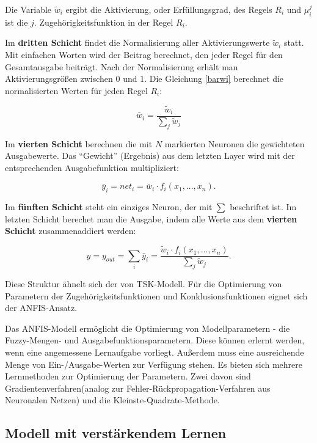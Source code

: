 Die Variable $\tilde{w}_i$ ergibt die Aktivierung, oder Erf\"{u}llungsgrad, des Regels $R_i$ und $\mu_i^j$ ist die $j.$ Zugehörigkeitsfunktion in der Regel $R_i$.

Im \textbf{dritten Schicht} findet die Normalisierung aller Aktivierungswerte $\tilde{w}_i$ statt. Mit einfachen Worten wird der Beitrag berechnet, den jeder Regel für den Gesamtausgabe beiträgt. Nach der Normalisierung erhält man Aktivierungsgrößen zwischen $0$ und $1$. Die Gleichung \ref{barwi} berechnet die normalisierten Werten für jeden Regel $R_i$:

\begin{equation}\label{barwi}
\bar{w}_i = \frac{\tilde{w}_i }{\sum_j \tilde{w}_j } 
\end{equation}

Im \textbf{vierten Schicht} berechnen die mit $N$ markierten Neuronen die gewichteten Ausgabewerte. Das ``Gewicht'' (Ergebnis) aus dem letzten Layer wird mit der entsprechenden Ausgabefunktion multipliziert:

\begin{equation}
\bar{y}_i = net_i = \bar{w}_i\cdot f_i(x_1, ..., x_n). 
\end{equation}

Im \textbf{fünften Schicht} steht ein einziges Neuron, der mit $\sum$ beschriftet ist. Im letzten Schicht berechet man die Ausgabe, indem alle Werte aus dem \textbf{vierten Schicht} zusammenaddiert werden:

\begin{equation}
y = y_{out} = \sum_i \bar{y}_i = \frac{\tilde{w}_i\cdot f_i(x_1, ..., x_n)}{\sum_j \tilde{w}_j}.
\end{equation}

Diese Struktur ähnelt sich der von TSK-Modell. Für die Optimierung von Parametern der Zugehörigkeitsfunktionen und Konklusionsfunktionen eignet sich der ANFIS-Ansatz.

Das ANFIS-Modell ermöglicht die Optimierung von Modellparametern - die Fuzzy-Mengen- und Ausgabefunktionsparametern. Diese können erlernt werden, wenn eine angemessene Lernaufgabe vorliegt. Außerdem muss eine ausreichende Menge von Ein-/Ausgabe-Werten zur Verfügung stehen. Es bieten sich mehrere Lernmethoden zur Optimierung der Parametern. Zwei davon sind Gradientenverfahren(analog zur Fehler-Rückpropagation-Verfahren aus Neuronalen Netzen) und die Kleinste-Quadrate-Methode. \cite{CIKruse:15} \cite{Jang:93}

\subsection{Modell mit verstärkendem Lernen}


